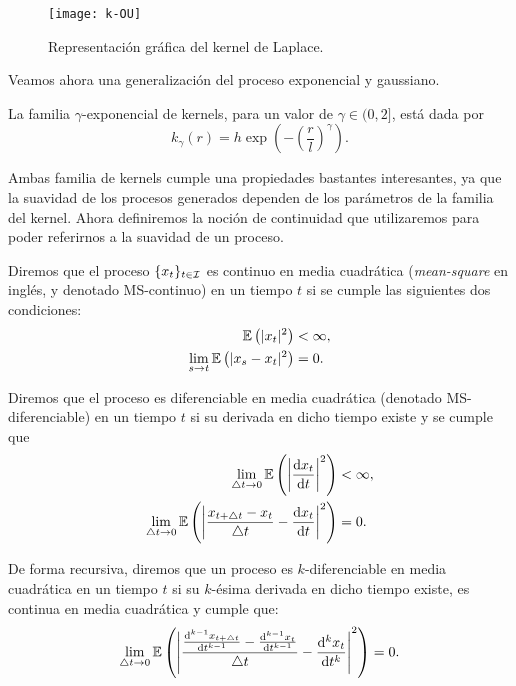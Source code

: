 \begin{figure}[h]
	\centering
	\texttt{[image: k-OU]}
	\caption{Representación gráfica del kernel de Laplace.}
\end{figure}

Veamos ahora una generalización del proceso exponencial y gaussiano.
\begin{definition}
	La familia \(\gamma\)-exponencial de kernels, para un valor de \(\gamma \in (0, 2]\), está dada por
	\begin{equation*}
		k_{\gamma}(r) = h \exp \left(-\left(\frac{r}{l}\right)^{\gamma}\right).
	\end{equation*}
\end{definition}

Ambas familia de kernels cumple una propiedades bastantes interesantes, ya que la suavidad de los procesos generados dependen de los parámetros de la familia del kernel. Ahora definiremos la noción de continuidad que utilizaremos para poder referirnos a la suavidad de un proceso.

\begin{definition}
	Diremos que el proceso \(\{x_{t}\}_{t \in \mathcal{I}}\) es continuo en media cuadrática (\emph{mean-square} en inglés, y denotado MS-continuo) en un tiempo \(t\) si se cumple las siguientes dos condiciones:
	\begin{align*}
		\mathbb{E}\left(\vert x_{t} \vert^{2}\right)							&< \infty, \\
		\lim_{s \to t} \mathbb{E}\left(\vert x_{s} - x_{t}\vert^{2}\right)	&= 0.
	\end{align*}
\end{definition}

\begin{definition}
	Diremos que el proceso es diferenciable en media cuadrática (denotado MS-diferenciable) en un tiempo \(t\) si su derivada en dicho tiempo existe y se cumple que
	\begin{align*}
		\lim_{\triangle t \to 0} \mathbb{E}\left( \left\vert \dv{x_{t}}{t} \right\vert^{2}\right)	&< \infty, \\
		\lim_{\triangle t \to 0} \mathbb{E}\left( \left\vert \frac{x_{t + \triangle t} - x_{t}}{\triangle t} - \dv{x_{t}}{t} \right\vert^{2} \right) &= 0.
	\end{align*}

	De forma recursiva, diremos que un proceso es \(k\)-diferenciable en media cuadrática en un tiempo \(t\) si su \(k\)-ésima derivada en dicho tiempo existe, es continua en media cuadrática y cumple que:
	\begin{equation*}
	\lim_{\triangle t \to 0} \mathbb{E} \left( \left\vert \frac{\dv[k-1]{x_{t + \triangle t}}{t} - \dv[k-1]{x_t}{t}}{\triangle t} - \dv[k]{x_{t}}{t} \right\vert^2\right) = 0.
	\end{equation*}
\end{definition}

